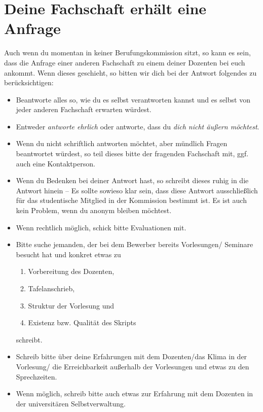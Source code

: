 \section{Deine Fachschaft erhält eine Anfrage}
Auch wenn du momentan in keiner Berufungskommission sitzt, so kann es sein, dass die Anfrage einer anderen Fachschaft zu einem deiner Dozenten bei euch ankommt. Wenn dieses geschieht, so bitten wir dich bei der Antwort folgendes zu berücksichtigen:
\begin{itemize}
    \item Beantworte alles so, wie du es selbst verantworten kannst und es selbst von jeder anderen Fachschaft erwarten würdest.
    \item Entweder \emph{antworte ehrlich} oder antworte, dass du \emph{dich nicht äußern möchtest}.
    \item Wenn du nicht schriftlich antworten möchtet, aber mündlich Fragen beantwortet würdest, so teil dieses bitte der fragenden Fachschaft mit, ggf. auch eine Kontaktperson.
    \item Wenn du Bedenken bei deiner Antwort hast, so schreibt dieses ruhig in die Antwort hinein -- Es sollte sowieso klar sein, dass diese Antwort ausschließlich für das studentische Mitglied in der Kommission bestimmt ist. Es ist auch kein Problem, wenn du anonym bleiben möchtest.
    \item Wenn rechtlich möglich, schick bitte Evaluationen mit.
    \item Bitte suche jemanden, der bei dem Bewerber bereits Vorlesungen/ Seminare besucht hat und konkret etwas zu
          \begin{enumerate}
              \item Vorbereitung des Dozenten,
              \item Tafelanschrieb,
              \item Struktur der Vorlesung und
              \item Existenz bzw. Qualität des Skripts
          \end{enumerate}
          schreibt.
    \item Schreib bitte über deine Erfahrungen mit dem Dozenten/das Klima in der Vorlesung/ die Erreichbarkeit außerhalb der Vorlesungen und etwas zu den Sprechzeiten.
    \item Wenn möglich, schreib bitte auch etwas zur Erfahrung mit dem Dozenten in der universitären Selbstverwaltung.
\end{itemize}

